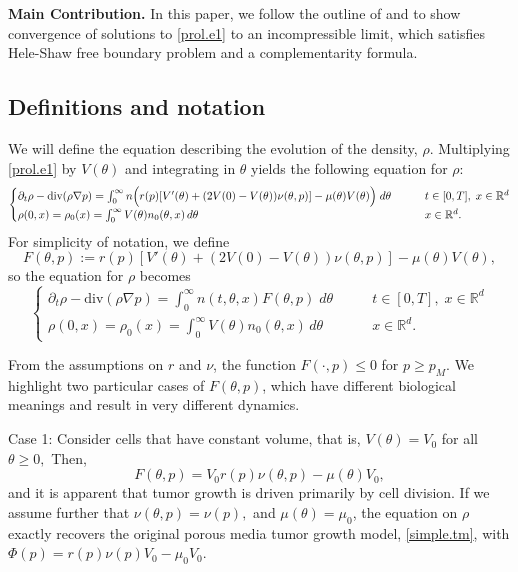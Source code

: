 \documentclass{amsart}
\def\R{\mathbb R}
\begin{document}
\medskip
\noindent \textbf{Main Contribution.} In this paper, we  follow the outline of \cite{david} and \cite{PerthameQuiros2014} to show convergence of solutions to \eqref{prol.e1} to an incompressible limit, which satisfies Hele-Shaw free boundary problem and a complementarity formula.

\subsection{Definitions and notation}



\medskip

We will define the equation describing the evolution of the density, $\rho.$
Multiplying \eqref{prol.e1} by $V(\theta)$ and integrating in $\theta$ yields the following equation for $\rho$:
\begin{equation*}
\begin{cases}
    \partial_t \rho -\text{div}(\rho\nabla p)=\int_{0}^{\infty}n\Bigl(r(p)[V'(\theta)+(2V(0)-V(\theta))\nu(\theta,p)]-\mu(\theta)V(\theta)\Bigr)\;d\theta\qquad & t \in [0,T],\;x \in \R^d
    \\
    \rho(0,x)=\rho_{0}(x)=\int_{0}^{\infty}V(\theta)n_{0}(\theta,x)\,d\theta \qquad & x \in \R^d.
    \end{cases}
\end{equation*}
For simplicity of notation, we define
\begin{equation}\label{capf}
F(\theta,p):=r(p)[V'(\theta)+(2V(0)-V(\theta))\nu(\theta,p)]-\mu(\theta)V(\theta),
\end{equation}
so the equation for $\rho$ becomes
\begin{equation}\label{prol.e2}
\begin{cases}
    \partial_t \rho -\text{div}(\rho\nabla p)=\int_{0}^{\infty}n(t,\theta,x)F(\theta,p)\;d\theta\qquad & t \in [0,T],\;x \in \R^d
    \\
    \rho(0,x)=\rho_{0}(x)=\int_{0}^{\infty}V(\theta)n_{0}(\theta,x)\,d\theta \qquad & x \in \R^d.
    \end{cases}
\end{equation}

From the assumptions on $r$ and $\nu$, the function $F(\cdot, p)\leq 0$ for $p \geq p_M$. We  highlight two particular cases of $F(\theta,p)$, which have different biological meanings and result in very different dynamics. 

Case 1: Consider cells that have constant volume, that is, $V(\theta)=V_0$ for all $\theta\geq 0,$  Then, $$F(\theta,p)=V_0r(p)\nu(\theta,p)-\mu(\theta)V_0,$$ and it is apparent that tumor growth is driven primarily by cell division. If we assume further that $\nu(\theta,p)=\nu(p),$ and $\mu(\theta)=\mu_0$, the equation on $\rho$ exactly recovers the original porous media tumor growth model, \eqref{simple.tm}, with $\Phi(p)=r(p)\nu(p)V_0-\mu_0V_0.$
\end{document}
